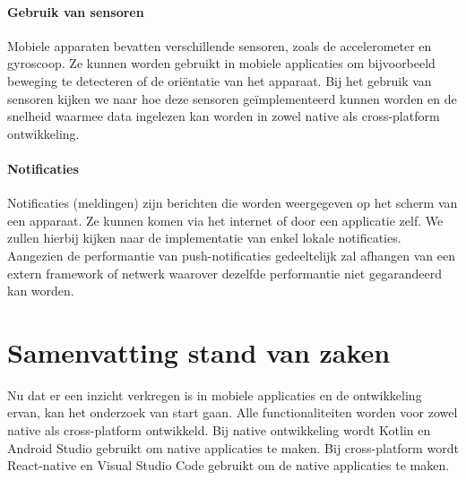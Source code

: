 \paragraph{Gebruik van sensoren}
Mobiele apparaten bevatten verschillende sensoren, zoals de accelerometer en gyroscoop. 
Ze kunnen worden gebruikt in mobiele applicaties om bijvoorbeeld beweging te detecteren 
of de oriëntatie van het apparaat. Bij het gebruik van sensoren kijken we naar hoe deze 
sensoren geïmplementeerd kunnen worden en de snelheid waarmee data ingelezen kan worden 
in zowel native als cross-platform ontwikkeling.

\paragraph{Notificaties}
Notificaties (meldingen) zijn berichten die worden weergegeven op het scherm van een 
apparaat. Ze kunnen komen via het internet of door een applicatie zelf. We zullen hierbij 
kijken naar de implementatie van enkel lokale notificaties. Aangezien de performantie van 
push-notificaties gedeeltelijk zal afhangen van een extern framework of netwerk waarover 
dezelfde performantie niet gegarandeerd kan worden.


\section{Samenvatting stand van zaken}
Nu dat er een inzicht verkregen is in mobiele applicaties en de ontwikkeling ervan, 
kan het onderzoek van start gaan. Alle functionaliteiten worden voor 
zowel native als cross-platform ontwikkeld. Bij native ontwikkeling wordt 
Kotlin en Android Studio gebruikt om native applicaties te maken. 
Bij cross-platform wordt React-native en Visual Studio Code gebruikt om de 
native applicaties te maken.














